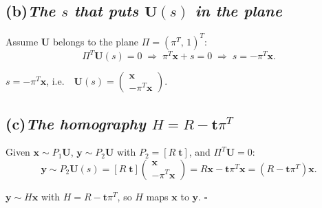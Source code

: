 \documentclass[11pt,a4paper]{article}
\newcommand{\vb}[1]{\mathbf{#1}}
\newcommand{\vect}[1]{
    \begin{pmatrix}#1
\end{pmatrix}}
\newcommand{\task}[2]{
\subsection*{#1\quad\normalfont\textit{#2}}}
\begin{document}
\task{(b)}{The $s$ that puts $\vb{U}(s)$ in the plane}

Assume $\vb{U}$ belongs to the plane $\Pi = (\pi^T,\,1)^T$:
\[
    \Pi^T\vb{U}(s) = 0
    \;\Longrightarrow\;
    \pi^T\vb{x} + s = 0
    \;\Longrightarrow\;
    s = -\pi^T\vb{x}.
\]
\begin{answer}
    $s = -\pi^T\vb{x}$, \quad i.e.\ \ $\vb{U}(s) =
    \vect{\vb{x}\\ -\pi^T\vb{x}}$.
\end{answer}

\task{(c)}{The homography $H = R - \vb{t}\pi^T$}

Given $\vb{x} \sim P_1\vb{U}$, $\vb{y} \sim P_2\vb{U}$ with $P_2 =
[R\;\vb{t}]$, and $\Pi^T\vb{U} = 0$:
\[
    \vb{y} \sim P_2\vb{U}(s)
    = [R\;\vb{t}]\vect{\vb{x}\\ -\pi^T\vb{x}}
    = R\vb{x} - \vb{t}\pi^T\vb{x}
    = \left(R - \vb{t}\pi^T\right)\vb{x}.
\]
\begin{answer}
    $\vb{y} \sim H\vb{x}$ with $H = R - \vb{t}\pi^T$, so $H$ maps
    $\vb{x}$ to $\vb{y}$. \hfill$\square$
\end{answer}
\end{document}
